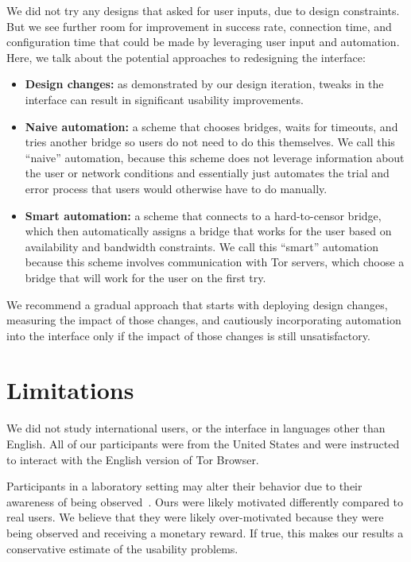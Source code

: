 \documentclass[USenglish,oneside,twocolumn]{article}
\begin{document}
We did not try any designs that asked for user inputs, due to design constraints. But we see further room for improvement in success rate, connection time, and configuration time that could be made by leveraging user input and automation. Here, we talk about the potential approaches to redesigning the interface:  \\

\begin{itemize}
\item{\bfseries Design changes:} as demonstrated by our design iteration, tweaks in the interface can result in significant usability improvements.
\item{\bfseries Naive automation:} a scheme that chooses bridges, waits for timeouts, and tries another bridge so users do not need to do this themselves. We call this ``naive'' automation, because this scheme does not leverage information about the user or network conditions and essentially just automates the trial and error process that users would otherwise have to do manually. 
\item{\bfseries Smart automation:} a scheme that connects to a hard-to-censor bridge, which then automatically assigns a bridge that works for the user based on availability and bandwidth constraints. We call this ``smart'' automation because this scheme involves communication with Tor servers, which choose a bridge that will work for the user on the first try. 
\end{itemize}

We recommend a gradual approach that starts with deploying design changes, measuring the impact of those changes, and cautiously incorporating automation into the interface only if the impact of those changes is still unsatisfactory. 

\section{Limitations}
\label{sec:limitations}
We did not study international users, or the interface in languages other than English. All of our participants were from the United States and were instructed to interact with the English version of Tor Browser.

Participants in a laboratory setting may alter their behavior due to their awareness of being observed~\cite{mccarney2007hawthorne}. Ours were likely motivated differently compared to real users. We believe that they were likely over-motivated because they were being observed and receiving a monetary reward. If true, this makes our results a conservative estimate of the usability problems. 
\end{document}
